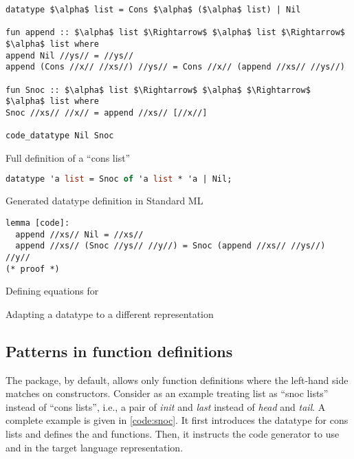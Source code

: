 \begin{code}[t]
  \begin{subcode}{\linewidth}
    \begin{lstlisting}
datatype $\alpha$ list = Cons $\alpha$ ($\alpha$ list) | Nil

fun append :: $\alpha$ list $\Rightarrow$ $\alpha$ list $\Rightarrow$ $\alpha$ list where
append Nil //ys// = //ys//
append (Cons //x// //xs//) //ys// = Cons //x// (append //xs// //ys//)

fun Snoc :: $\alpha$ list $\Rightarrow$ $\alpha$ $\Rightarrow$ $\alpha$ list where
Snoc //xs// //x// = append //xs// [//x//]

code_datatype Nil Snoc\end{lstlisting}
    \caption{Full definition of a ``cons list''}
  \end{subcode}
  \begin{subcode}{\linewidth}
    \begin{lstlisting}[language=ML]
datatype 'a list = Snoc of 'a list * 'a | Nil;\end{lstlisting}
    \caption{Generated datatype definition in Standard ML}
  \end{subcode}
  \begin{subcode}{\linewidth}
    \begin{lstlisting}
lemma [code]:
  append //xs// Nil = //xs//
  append //xs// (Snoc //ys// //y//) = Snoc (append //xs// //ys//) //y//
(* proof *)\end{lstlisting}
    \caption{Defining equations for }
  \end{subcode}

  \caption{Adapting a datatype to a different representation}
  \label{code:snoc}
\end{code}

\subsection{Patterns in function definitions}

The  package, by default, allows only function definitions where the left-hand side matches on constructors.
Consider as an example treating list as ``snoc lists'' instead of ``cons lists'', i.e., a pair of \emph{init} and \emph{last} instead of \emph{head} and \emph{tail}.
A complete example is given in \cref{code:snoc}.
It first introduces the datatype for cons lists and defines the  and  functions.
Then, it instructs the code generator to use  and  in the target language representation.

